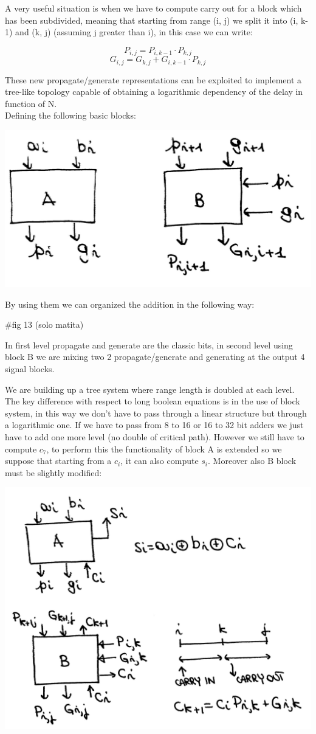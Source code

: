 A very useful situation is when we have to compute carry out for a block which has been subdivided, meaning that starting from range (i, j) we split it into (i, k-1) and (k, j) (assuming j greater than i), in this case we can write:

$$P_{i,j}=P_{i, k-1} \cdot P_{k, j}$$
$$ G_{i, j}=G_{k, j}+G_{i, k-1}\cdot P_{k, j}$$

These new propagate/generate representations can be exploited to implement a tree-like topology capable of obtaining a logarithmic dependency of the delay in function of N.\\

Defining the following basic blocks:

\begin{center}
  \includegraphics[width=0.6\linewidth]{img/img2/12}
\end{center}

By using them we can organized the addition in the following way:

 $\#$fig 13 (solo matita)

In first level propagate and generate are the classic bits, in second level using block B we are mixing two 2 propagate/generate and generating at the output 4 signal blocks.

We are building up a tree system where range length is doubled at each level. The key difference with respect to long boolean equations is in the use of block system, in this way we don't have to pass through a linear structure but through a logarithmic one. If we have to pass from 8 to 16 or 16 to 32 bit adders we just have to add one more level (no double of critical path). However we still have to compute $c_7$, to perform this the functionality of block A is extended so we suppose that starting from a $c_i$, it can also compute $s_i$. Moreover also B block must be slightly modified:
\begin{center}
  \includegraphics[width=0.6\linewidth]{img/img2/14}
\end{center}

